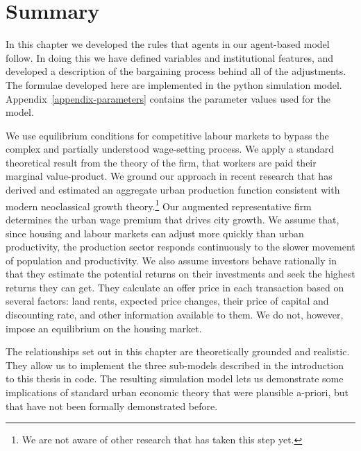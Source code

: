  
\section{Summary}
In this chapter we developed the rules that agents in our agent-based model follow. In doing this we have defined variables and institutional features, and developed a description of the bargaining process behind all of the adjustments. The formulae developed here are implemented in the python simulation model. %
Appendix~\ref{appendix-parameters} contains the parameter values used for the model.  %

 We use equilibrium conditions for competitive labour markets to bypass the complex and partially understood wage-setting process. We apply a standard theoretical result from the theory of the firm, that workers are paid their \gls{marginal value-product}. We ground our approach in recent research that has derived and estimated an aggregate urban production function consistent with modern \gls{neoclassical growth theory}.\footnote{We are not aware of other research that has taken this step yet.} Our augmented representative firm determines the urban wage premium that drives city growth. We assume that, since housing and labour markets can adjust more quickly than urban productivity, the production sector responds continuously to the slower movement of population and productivity. %
We also assume investors behave rationally in that they estimate the potential returns on their investments and seek the highest returns they can get. They calculate an offer price in each transaction based on several factors: land rents, expected price changes, their price of capital and discounting rate, and other information available to them. We do not, however, impose an equilibrium on the housing market.

The relationships set out in this chapter are theoretically grounded and realistic. They allow us to implement the three sub-models described in the introduction to this thesis in code. The resulting simulation model lets us demonstrate some implications of standard urban economic theory that were plausible a-priori, but that have not been formally demonstrated before.  

